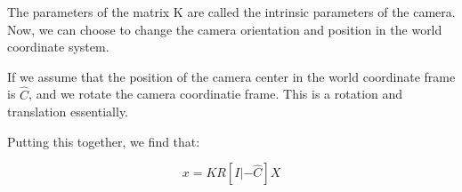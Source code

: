 The parameters of the matrix K are called the intrinsic parameters of the camera. Now, we can choose to change the camera orientation and position in the world coordinate system.

If we assume that the position of the camera center in the world coordinate frame is $\hat{C}$, and we rotate the camera coordinatie frame. This is a rotation and translation essentially.

Putting this together, we find that:

\begin{equation}
    x = KR[I|-\hat{C}]X
\end{equation}


